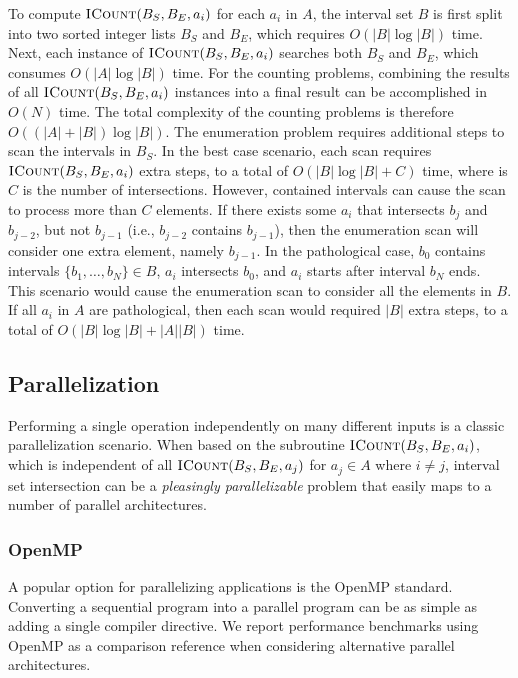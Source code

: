 \documentclass{bioinfo}
\begin{document}
	To compute $\textsc{ICount}(B_S,B_E,a_i)$ for each $a_i$ in $A$, the interval
	set $B$ is first split into two sorted integer lists $B_S$ and $B_E$,
	which requires $O(|B| \log |B|)$ time.  Next, each instance of
	$\textsc{ICount}(B_S,B_E,a_i)$ searches both $B_S$ and $B_E$, which consumes
	$O(|A| \log |B|)$ time.  For the counting problems, combining the
	results of all $\textsc{ICount}(B_S,B_E,a_i)$ instances into a final result can
	be accomplished in $O(N)$ time.  The total complexity of the counting
	problems is therefore $O((|A| + |B|) \log |B|)$.
	The enumeration problem requires additional steps to scan the
	intervals in $B_S$.  In the best case scenario, each scan requires
	$\textsc{ICount}(B_S,B_E,a_i)$ extra steps, to a total of $O(|B| \log |B|
	+ C)$ time, where is $C$ is the number of intersections.
	However,
	contained intervals can cause the scan to process more than $C$
	elements.  If there exists some $a_i$ that intersects $b_{j}$ and
	$b_{j-2}$, but not $b_{j-1}$ (i.e., $b_{j-2}$ contains $b_{j-1}$),
	then the enumeration scan will consider one extra element, namely
	$b_{j-1}$.  In the pathological case, $b_0$ contains intervals $\{b_1,
	\dots, b_N\} \in B$, $a_i$ intersects $b_0$, and $a_i$ starts after
	interval $b_N$ ends.  This scenario would cause the enumeration scan
	to consider all the elements in $B$.  If all $a_i$ in $A$ are
	pathological, then each scan would required $|B|$ extra steps, to a
	total of $O(|B| \log |B| + |A||B|)$ time.

	\subsection{Parallelization}

	Performing a single operation independently on many different inputs
	is a classic parallelization scenario.  When based on the subroutine
	$\textsc{ICount}(B_S,B_E,a_i)$, which is independent of all 
	$\textsc{ICount}(B_S,B_E,a_j)$
	for $a_j \in A$ where $i \neq j$, interval set intersection can be a
	{\em pleasingly parallelizable} problem that easily maps to a number
	of parallel architectures.

	\subsubsection{OpenMP}

	A popular option for parallelizing applications is the OpenMP standard.
	Converting a sequential program into a parallel program can be as simple as
	adding a single compiler directive.  We report performance benchmarks using
	OpenMP as a comparison reference when considering alternative parallel
	architectures.
\end{document}
